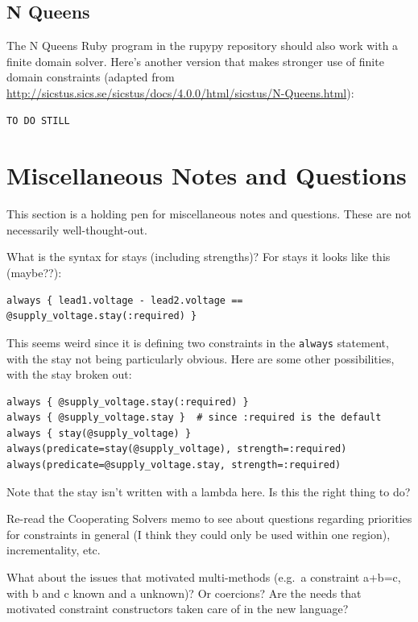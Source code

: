 \documentclass[11pt]{article}
\begin{document}
\subsection{N Queens}

The N Queens Ruby program in the rupypy repository should also work
with a finite domain solver.  Here's another version that makes
stronger use of finite domain
constraints (adapted from
\url{http://sicstus.sics.se/sicstus/docs/4.0.0/html/sicstus/N-Queens.html}):

\begin{lstlisting}
TO DO STILL
\end{lstlisting}

\section{Miscellaneous Notes and Questions}

This section is a holding pen for miscellaneous notes and questions.
These are not necessarily well-thought-out.

What is the syntax for stays (including strengths)?  
For stays it looks like this (maybe??):
\begin{lstlisting}
always { lead1.voltage - lead2.voltage == @supply_voltage.stay(:required) }
\end{lstlisting}

This seems weird since it is defining two constraints in the
\lstinline{always} statement, with the stay not being particularly
obvious.  Here are some other possibilities, with the stay broken out:

\begin{lstlisting}
always { @supply_voltage.stay(:required) }
always { @supply_voltage.stay }  # since :required is the default
always { stay(@supply_voltage) }
always(predicate=stay(@supply_voltage), strength=:required)
always(predicate=@supply_voltage.stay, strength=:required)
\end{lstlisting}

Note that the stay isn't written with a lambda here.  Is this the
right thing to do?

Re-read the Cooperating Solvers memo to see about questions regarding
priorities for constraints in general (I think they could only be used
within one region), incrementality, etc.

What about the issues that motivated multi-methods (e.g.\ a constraint
a+b=c, with b and c known and a unknown)?  Or coercions?  Are the
needs that motivated constraint constructors taken care of in the new
language?
\end{document}
